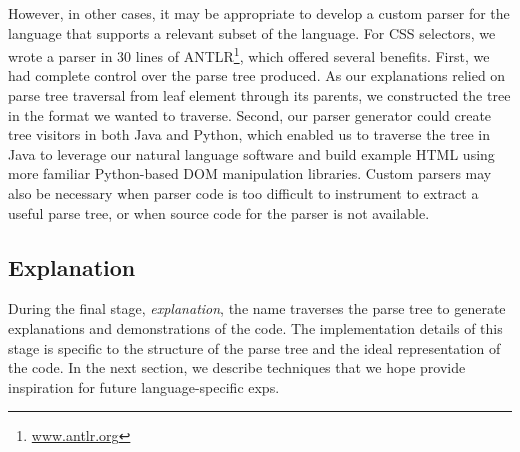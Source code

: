 However, in other cases, it may be appropriate to develop a custom parser for the language that supports a relevant subset of the language.
For CSS selectors, we wrote a parser in 30 lines of ANTLR\footnote{\url{www.antlr.org}}, which offered several benefits.
First, we had complete control over the parse tree produced.
As our explanations relied on parse tree traversal from leaf element through its parents, we constructed the tree in the format we wanted to traverse.
Second, our parser generator could create tree visitors in both Java and Python, which enabled us to traverse the tree in Java to leverage our natural language software and build example HTML using more familiar Python-based DOM manipulation libraries.
Custom parsers may also be necessary when parser code is too difficult to instrument to extract a useful parse tree, or when source code for the parser is not available.

\subsection{Explanation}

During the final stage, \emph{explanation}, the \gls{name} traverses the parse tree to generate explanations and demonstrations of the code.
The implementation details of this stage is specific to the structure of the parse tree and the ideal representation of the code.
In the next section, we describe techniques that we hope provide inspiration for future language-specific \glspl{exp}.